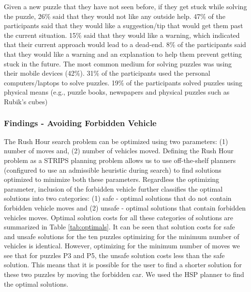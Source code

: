 Given a new puzzle that they have not seen before, if they get stuck while solving the puzzle, 26\% said that they would not like any outside help. 47\% of the participants said that they would like a suggestion/tip that would get them past the current situation. 15\% said that they would like a warning, which indicated that their current approach would lead to a dead-end. 8\% of the participants said that they would like a warning and an explanation to help them prevent getting stuck in the future.  The most common medium for solving puzzles was using their mobile devices (42\%). 31\% of the participants used the personal computers/laptops to solve puzzles. 19\% of the participants solved puzzles using physical means (e.g., puzzle books, newspapers and physical puzzles such as Rubik's  cubes)

\subsubsection*{Findings - Avoiding Forbidden Vehicle}
The Rush Hour search problem can be optimized using two parameters: (1) number of moves and, (2) number of vehicles moved. Defining the Rush Hour problem as a STRIPS planning problem allows us to use off-the-shelf planners (configured to use an admissible heuristic during search) to find solutions optimized to minimize both these parameters. Regardless the optimizing parameter, inclusion of the forbidden vehicle further classifies the optimal solutions into two categories: (1) safe - optimal solutions that do not contain forbidden vehicle moves and (2) unsafe - optimal solutions that contain forbidden vehicles moves. Optimal solution costs for all these categories of solutions are summarized in Table \ref{tab:optimals}. It can be seen that solution costs for safe and unsafe solutions for the ten puzzles optimizing for the minimum number of vehicles is identical. However, optimizing for the minimum number of moves we see that for puzzles P3 and P5, the unsafe solution costs less than the safe solution. This means that it is possible for the user to find a shorter solution for these two puzzles by moving the forbidden car. We used the HSP planner \cite{bonet01planningas} to find the optimal solutions.

